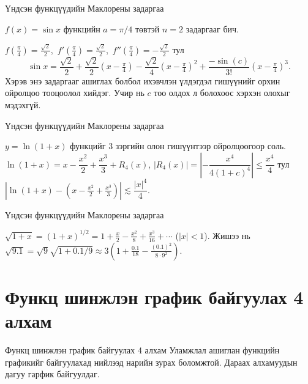 \begin{frame}[allowframebreaks]{Үндсэн функцүүдийн Маклорены задаргаа}
\begin{example}[Тэйлор $a=\pi/4$ төвтэй]
$f(x)=\sin x$ функцийн $a=\pi/4$ төвтэй $n=2$ задаргааг бич.

$f(\tfrac{\pi}{4})=\tfrac{\sqrt2}{2}$,\ $f'(\tfrac{\pi}{4})=\tfrac{\sqrt2}{2}$,\ $f''(\tfrac{\pi}{4})=-\tfrac{\sqrt2}{2}$ тул
\[
\sin x=\frac{\sqrt2}{2}+\frac{\sqrt2}{2}(x-\tfrac{\pi}{4})-\frac{\sqrt2}{4}(x-\tfrac{\pi}{4})^2+\frac{-\sin(c)}{3!}(x-\tfrac{\pi}{4})^3.
\] Хэрэв энэ задаргааг ашиглах болбол ихэвчлэн үлдэгдэл гишүүнийг орхин ойролцоо тооцоолол хийдэг. Учир нь $c$ тоо олдох л болохоос хэрхэн олохыг мэдэхгүй.
\end{example}
\end{frame}

\begin{frame}[allowframebreaks]{Үндсэн функцүүдийн Маклорены задаргаа}
\begin{example} $y=\ln(1+x)$ функцийг 3 зэргийн олон гишүүнтээр ойролцоогоор соль.\\
$\ln(1+x)=x-\dfrac{x^2}{2}+\dfrac{x^3}{3}+R_4(x)$,\quad 
$|R_4(x)|=|- \dfrac{x^4}{4(1+c)^4}|\leq \dfrac{x^4}{4}$ тул  $|\ln(1+x) - (x-\tfrac{x^2}{2}+\tfrac{x^3}{3})|\lesssim \dfrac{|x|^4}{4}$.
\end{example}
\end{frame}

\begin{frame}[allowframebreaks]{Үндсэн функцүүдийн Маклорены задаргаа}
\begin{example}
$\sqrt{1+x}=(1+x)^{1/2}=1+\frac{x}{2}-\frac{x^2}{8}+\frac{x^3}{16}+\cdots$ ($|x|<1$). 
Жишээ нь $\sqrt{9.1}=\sqrt{9}\sqrt{1+0.1/9}\approx 3\!\left(1+\frac{0.1}{18}-\frac{(0.1)^2}{8\cdot 9^2}\right)$.
\end{example}
\end{frame}

\section{Функц шинжлэн график байгуулах 4 алхам}
\begin{frame}[allowframebreaks]{Функц шинжлэн график байгуулах 4 алхам}
Уламжлал ашиглан функцийн графикийг байгуулахад нийлээд нарийн зурах боломжтой. Дараах алхамуудын дагуу гарфик байгуулдаг.
\end{frame}

